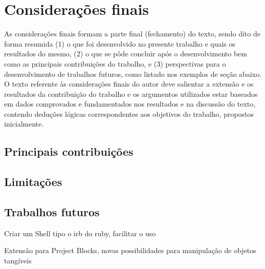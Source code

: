 \chapter{Considerações finais}
\label{cap:consideracoes}


As considerações finais formam a parte final (fechamento) do texto, sendo dito
de forma resumida (1) o que foi desenvolvido no presente trabalho e quais os
resultados do mesmo, (2) o que se pôde concluir após o desenvolvimento bem como
as principais contribuições do trabalho, e (3) perspectivas para o
desenvolvimento de trabalhos futuros, como listado nos exemplos de seção abaixo.
O texto referente às considerações finais do autor deve salientar a extensão e
os resultados da contribuição do trabalho e os argumentos utilizados estar
baseados em dados comprovados e fundamentados nos resultados e na discussão do
texto, contendo deduções lógicas correspondentes aos objetivos do trabalho,
propostos inicialmente.


\section{Principais contribuições}



\section{Limitações}



\section{Trabalhos futuros}

Criar um Shell tipo o irb do ruby, facilitar o uso

Extensão para Project Blocks, novas possibilidades para manipulação de objetos tangíveis
